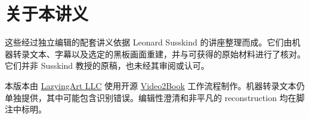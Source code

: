\documentclass[11pt,oneside]{book}
\begin{document}
\frontmatter
\hypersetup{pageanchor=false}

\hypersetup{pageanchor=true}

\clearpage
\chapter*{关于本讲义}
这些经过独立编辑的配套讲义依据 Leonard Susskind 的讲座整理而成。它们由机器转录文本、字幕以及选定的黑板画面重建，并与可获得的原始材料进行了核对。它们并非 Susskind 教授的原稿，也未经其审阅或认可。

本版本由 \href{https://lazying.art}{LazyingArt LLC} 使用开源 \href{https://github.com/lachlanchen/Video2Book}{Video2Book} 工作流程制作。机器转录文本仍单独提供，其中可能包含识别错误。编辑性澄清和非平凡的 reconstruction 均在脚注中标明。
\clearpage
\tableofcontents
\mainmatter










\end{document}
